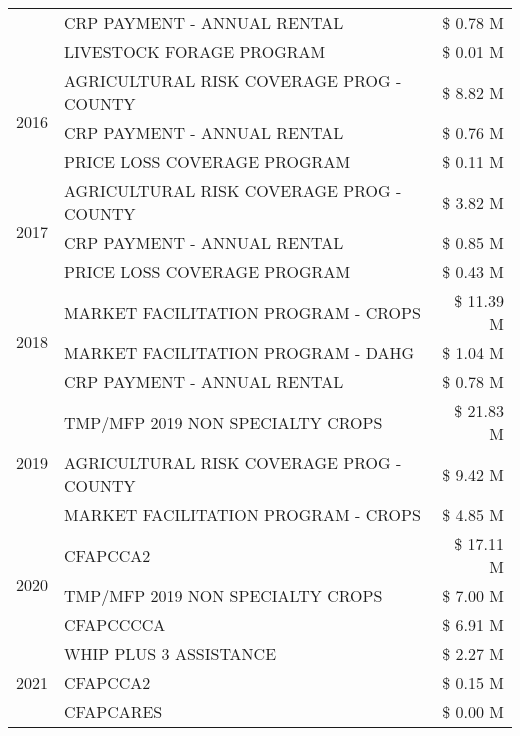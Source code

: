 \begin{tabular}{llr}
 & CRP PAYMENT - ANNUAL RENTAL & \$ 0.78 M \\
 & LIVESTOCK FORAGE PROGRAM & \$ 0.01 M \\
\cline{1-3}
\multirow[t]{3}{*}{2016} & AGRICULTURAL RISK COVERAGE PROG - COUNTY & \$ 8.82 M \\
 & CRP PAYMENT - ANNUAL RENTAL & \$ 0.76 M \\
 & PRICE LOSS COVERAGE PROGRAM & \$ 0.11 M \\
\cline{1-3}
\multirow[t]{3}{*}{2017} & AGRICULTURAL RISK COVERAGE PROG - COUNTY & \$ 3.82 M \\
 & CRP PAYMENT - ANNUAL RENTAL & \$ 0.85 M \\
 & PRICE LOSS COVERAGE PROGRAM & \$ 0.43 M \\
\cline{1-3}
\multirow[t]{3}{*}{2018} & MARKET FACILITATION PROGRAM - CROPS & \$ 11.39 M \\
 & MARKET FACILITATION PROGRAM - DAHG & \$ 1.04 M \\
 & CRP PAYMENT - ANNUAL RENTAL & \$ 0.78 M \\
\cline{1-3}
\multirow[t]{3}{*}{2019} & TMP/MFP 2019 NON SPECIALTY CROPS & \$ 21.83 M \\
 & AGRICULTURAL RISK COVERAGE PROG - COUNTY & \$ 9.42 M \\
 & MARKET FACILITATION PROGRAM - CROPS & \$ 4.85 M \\
\cline{1-3}
\multirow[t]{3}{*}{2020} & CFAPCCA2 & \$ 17.11 M \\
 & TMP/MFP 2019 NON SPECIALTY CROPS & \$ 7.00 M \\
 & CFAPCCCCA & \$ 6.91 M \\
\cline{1-3}
\multirow[t]{3}{*}{2021} & WHIP PLUS 3 ASSISTANCE & \$ 2.27 M \\
 & CFAPCCA2 & \$ 0.15 M \\
 & CFAPCARES & \$ 0.00 M \\
\cline{1-3}
\bottomrule
\end{tabular}
